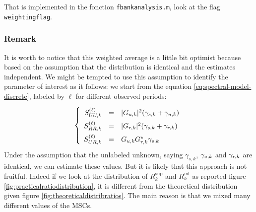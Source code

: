 That is implemented in the fonction {\tt fbankanalysis.m}, look at the flag {\tt weightingflag}.

\subsubsection{Remark}

It is worth to notice that this weighted average is a little bit optimist because based on the assumption that the distribution is identical and the estimates independent.
We might be tempted to use this assumption to identify the parameter of interest as it follows: we start from the equation \eqref{eq:spectral-model-discrete}, labeled by $\ell$ for different observed periods:
\begin{eqnarray}
\label{eq:spectral-model-discrete-ell}
\left\{
\renewcommand\arraystretch{1.6}
\begin{array}{rcl}
S_{UU,k}^{(\ell)}&=&|G_{\ut,k}|^{2} (\gamma_{s,k}+\gamma_{\ut,k})
\\
S_{RR,k}^{(\ell)}&=&|G_{\rf,k}|^{2} (\gamma_{s,k}+\gamma_{\rf,k})
\\
S_{UR,k}^{(\ell)}&=&G_{\ut,k}G^{*}_{\rf,k}\gamma_{s,k}
\end{array}
\right.
\end{eqnarray}
Under the assumption that the unlabeled unknown, saying $\gamma_{s,k}$, $\gamma_{{u},k}$  and
$\gamma_{{r},k}$ are identical, we can estimate these values. But it is likely that this approach is not fruitful. Indeed if we look at the distribution of  $R_{k}^{\sup}$ and $R_{k}^{\inf}$  as reported figure \ref{fig:practicalratiodistribution}, it is different from the theoretical distribution given figure \ref{fig:theoreticaldistribratios}. The  main reason is that we mixed many different values of the MSCs.



